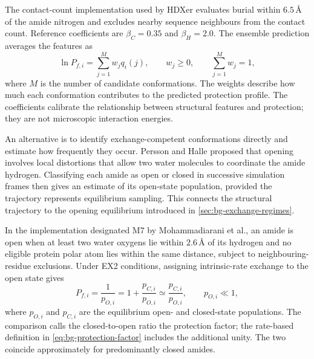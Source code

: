 The contact-count implementation used by HDXer evaluates burial within $6.5\,\text{\AA}$ of the amide nitrogen and excludes nearby sequence neighbours from the contact count. Reference coefficients are $\beta_C=0.35$ and $\beta_H=2.0$. The ensemble prediction averages the features as
\begin{equation}
    \ln P_{f,i}=\sum_{j=1}^{M}w_jq_i(j),
    \qquad w_j\geq0,\qquad\sum_{j=1}^{M}w_j=1,
    \label{eq:bg-bv-average}
\end{equation}
where $M$ is the number of candidate conformations.\supercite{bradshawInterpretationHDXData2020} The weights describe how much each conformation contributes to the predicted protection profile. The coefficients calibrate the relationship between structural features and protection; they are not microscopic interaction energies.

An alternative is to identify exchange-competent conformations directly and estimate how frequently they occur. Persson and Halle proposed that opening involves local distortions that allow two water molecules to coordinate the amide hydrogen.\supercite{perssonHowAmideHydrogens2015} Classifying each amide as open or closed in successive simulation frames then gives an estimate of its open-state population, provided the trajectory represents equilibrium sampling. This connects the structural trajectory to the opening equilibrium introduced in \cref{sec:bg-exchange-regimes}.

In the implementation designated M7 by Mohammadiarani et al., an amide is open when at least two water oxygens lie within $2.6\,\text{\AA}$ of its hydrogen and no eligible protein polar atom lies within the same distance, subject to neighbouring-residue exclusions.\supercite{mohammadiaraniInterpretingHydrogenDeuteriumExchange2018} Under EX2 conditions, assigning intrinsic-rate exchange to the open state gives
\begin{equation}
    P_{f,i}=\frac{1}{p_{O,i}}
    =1+\frac{p_{C,i}}{p_{O,i}}
    \simeq\frac{p_{C,i}}{p_{O,i}},
    \qquad p_{O,i}\ll1,
    \label{eq:bg-population-pf}
\end{equation}
where $p_{O,i}$ and $p_{C,i}$ are the equilibrium open- and closed-state populations. The comparison calls the closed-to-open ratio the protection factor; the rate-based definition in \cref{eq:bg-protection-factor} includes the additional unity. The two coincide approximately for predominantly closed amides.

